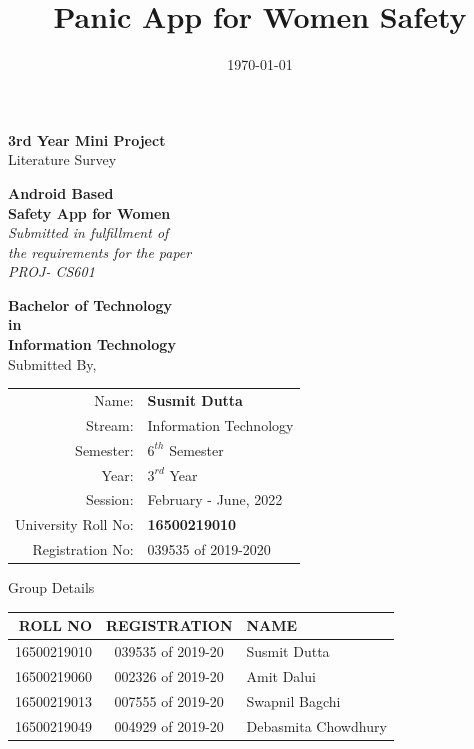 \documentclass[12pt, a4paper]{report}
\date{\today}
\title{Panic App for Women Safety}
\begin{document}
\begin{titlepage}


\begin{center}

\textup{\small {\bf 3rd Year Mini Project} \\ 
Literature Survey}

\Large \textbf {Android Based\\Safety App for Women  }\\[0.2in]

       \small \emph{Submitted in fulfillment of\\
        the requirements for the paper\\PROJ- CS601}
        \vspace{.1in}

       {\bf Bachelor of Technology \\in\\ Information Technology}\\[0.2in]
Submitted By,\\
\begin{table}[h]
\centering
\begin{tabular}{| r | l |}
\hline
Name: & \textbf{Susmit Dutta}\\
Stream: & Information Technology\\ 
Semester: & $6^{th}$ Semester\\
Year: & $3^{rd}$ Year\\
Session: & February - June, 2022\\
University Roll No: & \textbf{16500219010}\\
Registration No: & 039535 of 2019-2020\\ \hline
\end{tabular}
\end{table}
\normalsize Group Details\\
\begin{table}[h]
\centering
\begin{tabular}{ r  c  l }
\toprule
\textbf{ROLL NO} & \textbf{REGISTRATION} & \textbf{NAME} \\ \midrule
16500219010 & 039535 of 2019-20 & Susmit Dutta \\
16500219060 & 002326 of 2019-20 & Amit Dalui \\
16500219013 & 007555 of 2019-20 & Swapnil Bagchi \\
16500219049 & 004929 of 2019-20 & Debasmita Chowdhury\\

\end{tabular}
\end{table}
\end{center}
\end{titlepage}
\end{document}
